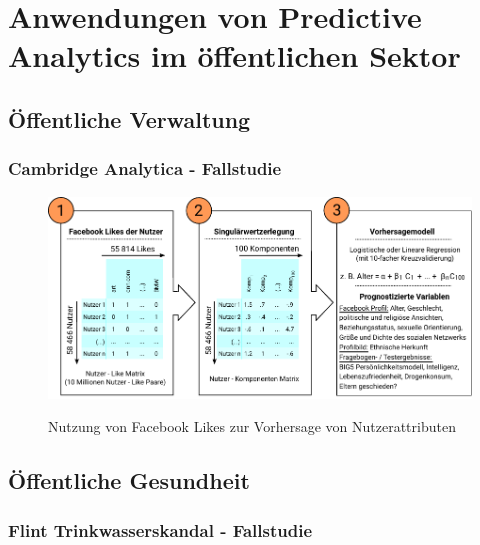 \documentclass[12pt,a4paper,listof=totoc,oneside]{scrreprt}
\begin{document}
\section{Anwendungen von Predictive Analytics im öffentlichen Sektor}


\subsection{Öffentliche Verwaltung}


\subsubsection{Cambridge Analytica - Fallstudie}

\begin{figure}%
\centering
\caption{Nutzung von Facebook Likes zur Vorhersage von Nutzerattributen}
\includegraphics[scale=1.0]{Grafiken/Facebook_Likes_Ink.pdf} 
\label{pic:Like_Matrix}
\end{figure}

\subsection{Öffentliche Gesundheit}


\subsubsection{Flint Trinkwasserskandal - Fallstudie}
\end{document}
